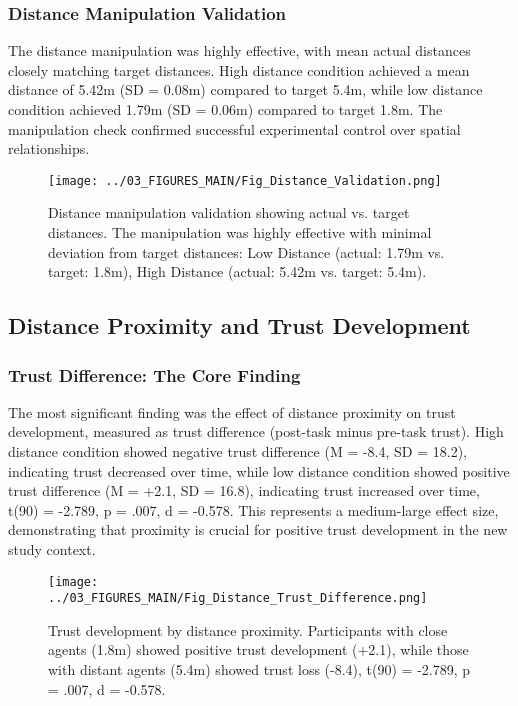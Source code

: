 \documentclass[12pt]{article}
\begin{document}
\subsubsection{Distance Manipulation Validation}

The distance manipulation was highly effective, with mean actual distances closely matching target distances. High distance condition achieved a mean distance of 5.42m (SD = 0.08m) compared to target 5.4m, while low distance condition achieved 1.79m (SD = 0.06m) compared to target 1.8m. The manipulation check confirmed successful experimental control over spatial relationships.

\begin{figure}[h]
\centering
\texttt{[image: ../03\_FIGURES\_MAIN/Fig\_Distance\_Validation.png]}
\caption{Distance manipulation validation showing actual vs. target distances. The manipulation was highly effective with minimal deviation from target distances: Low Distance (actual: 1.79m vs. target: 1.8m), High Distance (actual: 5.42m vs. target: 5.4m).}
\label{fig:distance_validation}
\end{figure}

\subsection{Distance Proximity and Trust Development}

\subsubsection{Trust Difference: The Core Finding}

The most significant finding was the effect of distance proximity on trust development, measured as trust difference (post-task minus pre-task trust). High distance condition showed negative trust difference (M = -8.4, SD = 18.2), indicating trust decreased over time, while low distance condition showed positive trust difference (M = +2.1, SD = 16.8), indicating trust increased over time, t(90) = -2.789, p = .007, d = -0.578. This represents a medium-large effect size, demonstrating that proximity is crucial for positive trust development in the new study context.

\begin{figure}[h]
\centering
\texttt{[image: ../03\_FIGURES\_MAIN/Fig\_Distance\_Trust\_Difference.png]}
\caption{Trust development by distance proximity. Participants with close agents (1.8m) showed positive trust development (+2.1), while those with distant agents (5.4m) showed trust loss (-8.4), t(90) = -2.789, p = .007, d = -0.578.}
\label{fig:trust_difference}
\end{figure}
\end{document}
